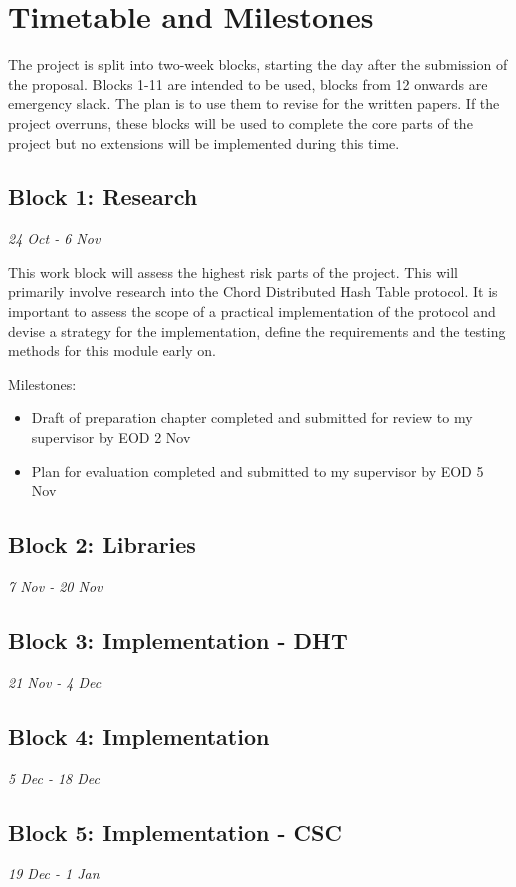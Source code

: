 \documentclass[12pt]{article}
\begin{document}
\section{Timetable and Milestones}

The project is split into two-week blocks, starting the day after the submission of the proposal. Blocks 1-11 are intended to be used, blocks from 12 onwards are emergency slack. The plan is to use them to revise for the written papers. If the project overruns, these blocks will be used to complete the core parts of the project but no extensions will be implemented during this time.


\subsection{Block 1: Research}
\emph{24 Oct - 6 Nov}  %

This work block will assess the highest risk parts of the project. This will primarily involve research into the Chord Distributed Hash Table protocol. It is important to assess the scope of a practical implementation of the protocol and devise a strategy for the implementation, define the requirements and the testing methods for this module early on.

Milestones:
\begin{itemize}
\item{Draft of preparation chapter completed and submitted for review to my supervisor by EOD 2 Nov}
\item{Plan for evaluation completed and submitted to my supervisor by EOD 5 Nov}
\end{itemize}

\subsection{Block 2: Libraries}
\emph{7 Nov - 20 Nov}  %
\subsection{Block 3: Implementation - DHT}
\emph{21 Nov - 4 Dec}  %
\subsection{Block 4: Implementation}
\emph{5 Dec - 18 Dec}  %
\subsection{Block 5: Implementation - CSC}
\emph{19 Dec - 1 Jan}  %
\end{document}
